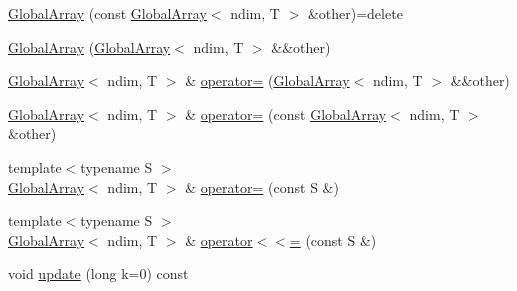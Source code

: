 \begin{DoxyCompactItemize}
\item 
\hyperlink{classshark_1_1ndim_1_1_global_array_ac2140f54377695ea7d2898ebfe69fee9}{Global\+Array} (const \hyperlink{classshark_1_1ndim_1_1_global_array}{Global\+Array}$<$ ndim, T $>$ \&other)=delete
\item 
\hyperlink{classshark_1_1ndim_1_1_global_array_a963ccb19d6e77904259a7ca500cfb514}{Global\+Array} (\hyperlink{classshark_1_1ndim_1_1_global_array}{Global\+Array}$<$ ndim, T $>$ \&\&other)
\item 
\hyperlink{classshark_1_1ndim_1_1_global_array}{Global\+Array}$<$ ndim, T $>$ \& \hyperlink{classshark_1_1ndim_1_1_global_array_a65fd825eff8e4b3d49f1111e487991f3}{operator=} (\hyperlink{classshark_1_1ndim_1_1_global_array}{Global\+Array}$<$ ndim, T $>$ \&\&other)
\item 
\hyperlink{classshark_1_1ndim_1_1_global_array}{Global\+Array}$<$ ndim, T $>$ \& \hyperlink{classshark_1_1ndim_1_1_global_array_a34d08c80663eaade55f75682e3c12e2f}{operator=} (const \hyperlink{classshark_1_1ndim_1_1_global_array}{Global\+Array}$<$ ndim, T $>$ \&other)
\item 
{\footnotesize template$<$typename S $>$ }\\\hyperlink{classshark_1_1ndim_1_1_global_array}{Global\+Array}$<$ ndim, T $>$ \& \hyperlink{classshark_1_1ndim_1_1_global_array_a4a66a7ee10a7ba6c22690c74824ce73e}{operator=} (const S \&)
\item 
{\footnotesize template$<$typename S $>$ }\\\hyperlink{classshark_1_1ndim_1_1_global_array}{Global\+Array}$<$ ndim, T $>$ \& \hyperlink{classshark_1_1ndim_1_1_global_array_ab76900c34fa648d9a953fbfb55c5131e}{operator$<$$<$=} (const S \&)
\item 
void \hyperlink{classshark_1_1ndim_1_1_global_array_a27631077480a0cda76b968d6b21f0da4}{update} (long k=0) const
\begin{DoxyCompactList}\small\item\em 


\end{DoxyCompactList}
\end{DoxyCompactItemize}
